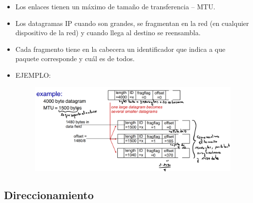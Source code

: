 \documentclass[12pt, twoside, openright]{report} %
\begin{document}
\begin{itemize}
	\item Los enlaces tienen un máximo de tamaño de transferencia -- MTU.
	\item Los datagramas IP cuando son grandes, se fragmentan en la red (en
	      cualquier dispositivo de la red) y cuando llega al destino se
	      reensambla.
	\item Cada fragmento tiene en la cabecera un identificador que indica a
	      que paquete corresponde y cuál es de todos.
	\item EJEMPLO:
	      \begin{figure}[H]
		      {\includegraphics[scale=.21]{Untitled 29.png}}
	      \end{figure}
\end{itemize}

\pagebreak
\subsection{Direccionamiento}
\end{document}
